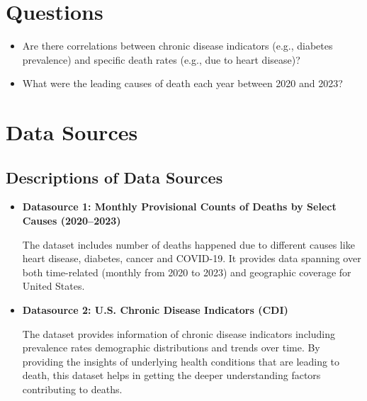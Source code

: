 \documentclass[a4paper,10pt]{article}
\begin{document}
	
	\section{Questions}
		\begin{itemize}
			\item Are there correlations between chronic disease indicators (e.g., diabetes prevalence) and specific death rates (e.g., due to heart disease)?
			\item What were the leading causes of death each year between 2020 and 2023?
		\end{itemize}
	
	\section{Data Sources}
	\subsection{Descriptions of Data Sources}
	\begin{itemize}
		\item \textbf{Datasource 1: Monthly Provisional Counts of Deaths by Select Causes (2020--2023)}
		
		The dataset includes number of deaths happened due to different causes like heart disease, diabetes, cancer and COVID-19. It provides data spanning over both time-related (monthly from 2020 to 2023) and geographic coverage for United States. \cite{dataset1}
	
	\end{itemize}

	\begin{itemize}
		\item \textbf{Datasource 2: U.S. Chronic Disease Indicators (CDI)} 
		
		The dataset provides information of chronic disease indicators  including prevalence rates demographic distributions and trends over time. By providing the insights of underlying health conditions that are leading to death, this dataset helps in getting the deeper understanding factors contributing to deaths. \cite{dataset2}
		
	\end{itemize}
	
\end{document}

